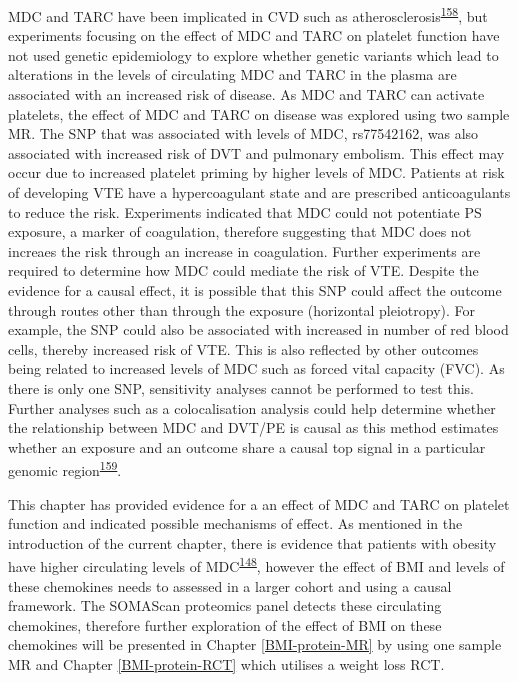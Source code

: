 \documentclass[11pt,twoside]{bristolthesis}
\begin{document}
MDC and TARC have been implicated in CVD such as atherosclerosis\textsuperscript{\protect\hyperlink{ref-Weber2004}{158}}, but experiments focusing on the effect of MDC and TARC on platelet function have not used genetic epidemiology to explore whether genetic variants which lead to alterations in the levels of circulating MDC and TARC in the plasma are associated with an increased risk of disease. As MDC and TARC can activate platelets, the effect of MDC and TARC on disease was explored using two sample MR. The SNP that was associated with levels of MDC, rs77542162, was also associated with increased risk of DVT and pulmonary embolism. This effect may occur due to increased platelet priming by higher levels of MDC. Patients at risk of developing VTE have a hypercoagulant state and are prescribed anticoagulants to reduce the risk. Experiments indicated that MDC could not potentiate PS exposure, a marker of coagulation, therefore suggesting that MDC does not increaes the risk through an increase in coagulation. Further experiments are required to determine how MDC could mediate the risk of VTE. Despite the evidence for a causal effect, it is possible that this SNP could affect the outcome through routes other than through the exposure (horizontal pleiotropy). For example, the SNP could also be associated with increased in number of red blood cells, thereby increased risk of VTE. This is also reflected by other outcomes being related to increased levels of MDC such as forced vital capacity (FVC). As there is only one SNP, sensitivity analyses cannot be performed to test this. Further analyses such as a colocalisation analysis could help determine whether the relationship between MDC and DVT/PE is causal as this method estimates whether an exposure and an outcome share a causal top signal in a particular genomic region\textsuperscript{\protect\hyperlink{ref-Giambartolomei2014}{159}}.

This chapter has provided evidence for a an effect of MDC and TARC on platelet function and indicated possible mechanisms of effect. As mentioned in the introduction of the current chapter, there is evidence that patients with obesity have higher circulating levels of MDC\textsuperscript{\protect\hyperlink{ref-Safa2016}{148}}, however the effect of BMI and levels of these chemokines needs to assessed in a larger cohort and using a causal framework. The SOMAScan proteomics panel detects these circulating chemokines, therefore further exploration of the effect of BMI on these chemokines will be presented in Chapter \ref{BMI-protein-MR} by using one sample MR and Chapter \ref{BMI-protein-RCT} which utilises a weight loss RCT.
\end{document}

